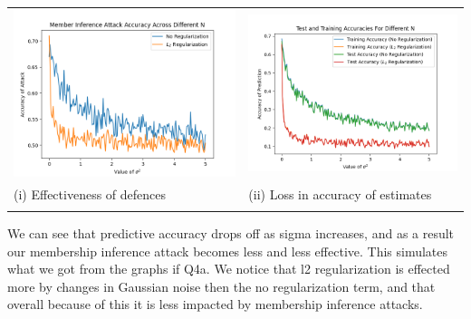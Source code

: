 \documentclass{article}
\begin{document}
\begin{titlepage}
\begin{tabular}{ll}

 \includegraphics[width=.5\linewidth]{q4f.png} &  \includegraphics[width=.5\linewidth]{Q4g.png}\\
 \hfil (i) Effectiveness of defences  \hfil & \hfil (ii) Loss in accuracy of estimates \hfil \\\\
 
\end{tabular}
We can see that predictive accuracy drops off as sigma increases, and as a result our membership inference attack becomes less and less effective. This simulates what we got from the graphs if Q4a. We notice that l2 regularization is effected more by changes in Gaussian noise then the no regularization term, and that overall because of this it is less impacted by membership inference attacks.
\end{titlepage}
\end{document}
